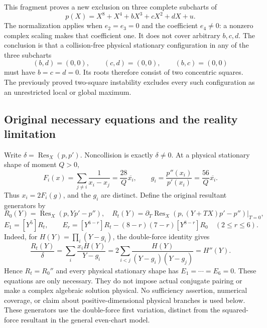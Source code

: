 \documentclass[11pt,a4paper]{article}
\theoremstyle{remark}
\begin{document}
This fragment proves a new exclusion on three complete subcharts of
\[
 p(X)=X^8+X^4+bX^3+cX^2+dX+u.
\]
The normalization applies when \(e_2=e_3=0\) and the coefficient
\(e_4\ne0\): a nonzero complex scaling makes that coefficient one.
It does not cover arbitrary \(b,c,d\). The conclusion is that a
collision-free physical stationary configuration in any of the three
subcharts
\[
 (b,d)=(0,0),\qquad(c,d)=(0,0),\qquad(b,c)=(0,0)
\]
must have \(b=c=d=0\). Its roots therefore consist of two concentric
squares. The previously proved two-square instability excludes every
such configuration as an unrestricted local or global maximum.

\subsection{Original necessary equations and the reality limitation}
Write \(\delta=\operatorname{Res}_X(p,p')\). Noncollision is exactly
\(\delta\ne0\). At a physical stationary shape of moment \(Q>0\),
\[
 F_i(x)=\sum_{j\ne i}\frac1{x_i-x_j}
       =\frac{28}{Q}\overline{x_i},\qquad
 g_i=\frac{p''(x_i)}{p'(x_i)}=\frac{56}{Q}\overline{x_i}.
\]
Thus \(x_i=2F_i(g)\), and the \(g_i\) are distinct. Define the
original resultant generators by
\[
 R_0(Y)=\operatorname{Res}_X(p,Yp'-p''),\quad
 R_t(Y)=\left.\partial_T\operatorname{Res}_X
          (p,(Y+TX)p'-p'')\right|_{T=0},
\]
\[
 E_1=[Y^5]R_t,\qquad
 E_r=[Y^{6-r}]R_t-(8-r)(7-r)[Y^{8-r}]R_0
       \quad(2\le r\le6).
\]
Indeed, for \(H(Y)=\prod_i(Y-g_i)\), the double-force identity gives
\[
 \frac{R_t(Y)}{\delta}
 =\sum_i\frac{x_iH(Y)}{Y-g_i}
 =2\sum_{i<j}\frac{H(Y)}{(Y-g_i)(Y-g_j)}
 =H''(Y).
\]
Hence \(R_t=R_0''\) and every physical stationary shape has
\(E_1=\cdots=E_6=0\). These equations are only necessary. They do
not impose actual conjugate pairing or make a complex algebraic
solution physical. No sufficiency assertion, numerical coverage, or
claim about positive-dimensional physical branches is used below.
These generators use the double-force first variation, distinct from
the squared-force resultant in the general even-chart model.
\end{document}
